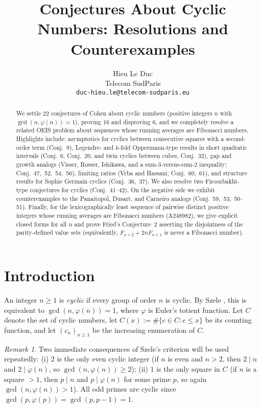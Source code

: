 \documentclass[12pt]{article}
\providecommand{\seqnum}[1]{#1}
\theoremstyle{remark}
\newtheorem*{remark}{Remark}
\begin{document}
\sloppy

\title{Conjectures About Cyclic Numbers: Resolutions and Counterexamples}
\author{Hieu Le Duc \\
Telecom SudParis \\
\texttt{duc-hieu.le@telecom-sudparis.eu}}
\date{}
\maketitle

\begin{abstract}
We settle 22 conjectures of Cohen about cyclic numbers (positive integers $n$ with $\gcd(n,\varphi(n))=1$), proving 16 and disproving 6, and we completely resolve a related OEIS problem about sequences whose running averages are Fibonacci numbers. Highlights include: asymptotics for cyclics between consecutive squares with a second-order term (Conj.~9), Legendre- and $k$-fold Oppermann-type results in short quadratic intervals (Conj.~6, Conj.~20, and twin cyclics between cubes, Conj.~32), gap and growth analogs (Visser, Rosser, Ishikawa, and a sum-3-versus-sum-2 inequality; Conj.~47,~52,~54,~56), limiting ratios (Vrba and Hassani; Conj.~60,~61), and structure results for Sophie Germain cyclics (Conj.~36,~37). We also resolve two Firoozbakht-type conjectures for cyclics (Conj.~41--42). On the negative side we exhibit counterexamples to the Panaitopol, Dusart, and Carneiro analogs (Conj.~59,~53,~50--51). Finally, for the lexicographically least sequence of pairwise distinct positive integers whose running averages are Fibonacci numbers (\seqnum{A248982}), we give explicit closed forms for all $n$ and prove Fried's Conjecture~2 asserting the disjointness of the parity-defined value sets (equivalently, $F_{n+2}+2nF_{n+1}$ is never a Fibonacci number).
\end{abstract}

\section{Introduction}
An integer $n\ge1$ is \emph{cyclic} if every group of order $n$ is cyclic. By Szele \cite{Szele1947}, this is equivalent to $\gcd(n,\varphi(n))=1$, where $\varphi$ is Euler's totient function. Let $C$ denote the set of cyclic numbers, let $C(x):=\#\{c\in C: c\le x\}$ be its counting function, and let $(c_n)_{n\ge1}$ be the increasing enumeration of $C$.

\begin{remark}
Two immediate consequences of Szele's criterion will be used repeatedly: (i) $2$ is the only even cyclic integer (if $n$ is even and $n>2$, then $2\mid n$ and $2\mid \varphi(n)$, so $\gcd(n,\varphi(n))\ge2$); (ii) $1$ is the only square in $C$ (if $n$ is a square $>1$, then $p\mid n$ and $p\mid \varphi(n)$ for some prime $p$, so again $\gcd(n,\varphi(n))>1$). All odd primes are cyclic since $\gcd(p,\varphi(p))=\gcd(p,p-1)=1$.
\end{remark}
\end{document}

